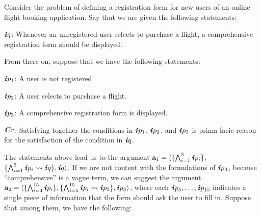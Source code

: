 \documentclass[10pt, conference, compsocconf]{IEEEtran}
\begin{document}

\begin{example}\label{ex:fly}
Consider the problem of defining a registration form for new users of an online flight booking application. Say that we are given the following statements:

\begin{instexample}
$\textbf{\textit{i}}q$: \textsf{Whenever an unregistered user selects to purchase a flight, a comprehensive registration form should be displayed.}
\end{instexample}

From there on, suppose that we have the following statements:

\begin{instexample}
$\textbf{\textit{i}}p_{1}$: \textsf{A user is not registered.}
\end{instexample}

\begin{instexample}
$\textbf{\textit{i}}p_{2}$: \textsf{A user selects to purchase a flight.}
\end{instexample}

\begin{instexample}
$\textbf{\textit{i}}p_{3}$: \textsf{A comprehensive registration form is displayed.}
\end{instexample}

\begin{instexample}
$\textbf{\textit{C}}r$: \textsf{Satisfying together the conditions in $\textbf{\textit{i}}p_{1}$, $\textbf{\textit{i}}p_{2}$, and $\textbf{\textit{i}}p_{3}$ is prima facie reason for the satisfaction of the condition in $\textbf{\textit{i}}q$.}
\end{instexample}

The statements above lead us to the argument $\textbf{a}_{1} = \langle \{ \bigwedge_{i=1}^{3}\textbf{\textit{i}}p_{i} \},$ $\{ \bigwedge_{i=1}^{3}\textbf{\textit{i}}p_{i} \rightsquigarrow \textbf{\textit{i}}q \}, \textbf{\textit{i}}q \rangle$. If we are not content with the formulations of $\textbf{\textit{i}}p_{3}$, because ``comprehensive'' is a vague term, we can suggest the argument $\textbf{a}_{2} = \langle \{ \bigwedge_{i=4}^{15}\textbf{\textit{i}}p_{i} \}, \{ \bigwedge_{i=5}^{15}\textbf{\textit{i}}p_{i} \rightsquigarrow \textbf{\textit{i}}p_{3} \}, \textbf{\textit{i}}p_{3} \rangle$, where each $\textbf{\textit{i}}p_{5}, \ldots, \textbf{\textit{i}}p_{15}$ indicates a single piece of information that the form should ask the user to fill in. Suppose that among them, we have the following:


\end{example}
\end{document}
